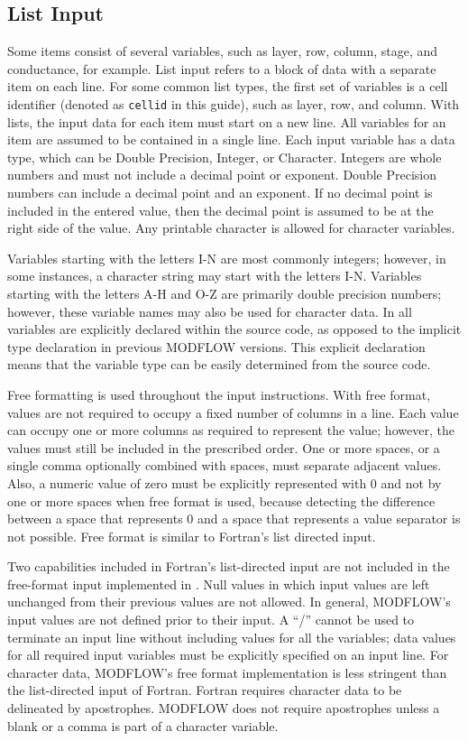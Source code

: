 \subsection{List Input}
Some items consist of several variables, such as layer, row, column, stage, and conductance, for example.  List input refers to a block of data with a separate item on each line.  For some common list types, the first set of variables is a cell identifier (denoted as \texttt{cellid} in this guide), such as layer, row, and column. With lists, the input data for each item must start on a new line. All variables for an item are assumed to be contained in a single line.  Each input variable has a data type, which can be Double Precision, Integer, or Character. Integers are whole numbers and must not include a decimal point or exponent. Double Precision numbers can include a decimal point and an exponent. If no decimal point is included in the entered value, then the decimal point is assumed to be at the right side of the value. Any printable character is allowed for character variables. 

Variables starting with the letters I-N are most commonly integers; however, in some instances, a character string may start with the letters I-N. Variables starting with the letters A-H and O-Z are primarily double precision numbers; however, these variable names may also be used for character data.  In \mf all variables are explicitly declared within the source code, as opposed to the implicit type declaration in previous MODFLOW versions.  This explicit declaration means that the variable type can be easily determined from the source code.

Free formatting is used throughout the input instructions.  With free format, values are not required to occupy a fixed number of columns in a line. Each value can occupy one or more columns as required to represent the value; however, the values must still be included in the prescribed order. One or more spaces, or a single comma optionally combined with spaces, must separate adjacent values. Also, a numeric value of zero must be explicitly represented with 0 and not by one or more spaces when free format is used, because detecting the difference between a space that represents 0 and a space that represents a value separator is not possible. Free format is similar to Fortran's list directed input.

Two capabilities included in Fortran's list-directed input are not included in the free-format input implemented in \mf. Null values in which input values are left unchanged from their previous values are not allowed. In general, MODFLOW's input values are not defined prior to their input.  A ``/'' cannot be used to terminate an input line without including values for all the variables; data values for all required input variables must be explicitly specified on an input line.  For character data, MODFLOW's free format implementation is less stringent than the list-directed input of Fortran. Fortran requires character data to be delineated by apostrophes. MODFLOW does not require apostrophes unless a blank or a comma is part of a character variable.

